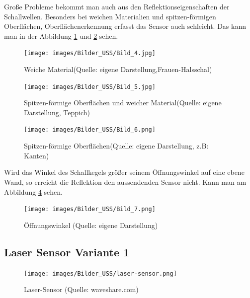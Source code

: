 Große Probleme bekommt man auch aus den Reflektionseigenschaften der Schallwellen. Besonders bei weichen Materialien und spitzen-förmigen Oberflächen,
Oberflächenerkennung erfasst das Sensor auch schleicht. Das kann man in der Abbildung \ref{bild_4} und \ref{bild_5} sehen.

\begin{figure}[h]  %
	\centering\texttt{[image: images/Bilder\_USS/Bild\_4.jpg]}
	\caption{Weiche Material\newline(Quelle: eigene Darstellung,Frauen-Halsschal)}
	\label{bild_4}
\end{figure}

\begin{figure}[h]  %
	\centering\texttt{[image: images/Bilder\_USS/Bild\_5.jpg]}
	\caption{Spitzen-förmige Oberflächen und weicher Material\newline(Quelle: eigene Darstellung, Teppich)}
	\label{bild_5}
\end{figure}

\begin{figure}[h]  %
	\centering\texttt{[image: images/Bilder\_USS/Bild\_6.png]}
	\caption{Spitzen-förmige Oberflächen\newline(Quelle: eigene Darstellung, z.B: Kanten)}
	\label{bild_6}
\end{figure}

Wird das Winkel des Schallkegels größer seinem Öffnungswinkel auf eine ebene Wand, so erreicht die Reflektion den aussendenden Sensor nicht. Kann man am Abbildung \ref{bild_7} sehen.

\begin{figure}[h]  %
	\centering\texttt{[image: images/Bilder\_USS/Bild\_7.png]}
	\caption{Öffnungswinkel (Quelle: eigene Darstellung)}
	\label{bild_7} %
\end{figure}


 
 
\newpage
 
 
\subsection{Laser Sensor Variante 1}

\begin{figure}[h]  %
	\centering\texttt{[image: images/Bilder\_USS/laser-sensor.png]}
	\caption{Laser-Sensor (Quelle: waveshare.com)}
	\label{laser-sensor} %
\end{figure}

